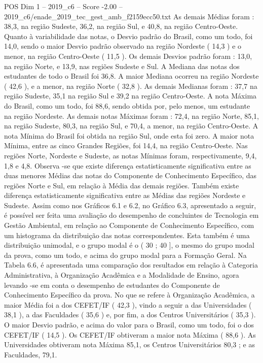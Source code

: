 \begin{textsample}{POS Dim 1 – 2019\_c6 – Score -2.00 – 2019\_c6/enade\_2019\_tec\_gest\_amb\_f2159ecc50.txt}
As demais Médias foram : 38,3, na região Sudeste, 36,2, na região Sul, e 40,8, na região Centro-Oeste.
Quanto à variabilidade das notas, o Desvio padrão do Brasil, como um todo, foi 14,0, sendo o maior Desvio padrão observado na região Nordeste ( 14,3 ) e o menor, na região Centro-Oeste ( 11,5 ).
Os demais Desvios padrão foram : 13,0, na região Norte, e 13,9, nas regiões Sudeste e Sul.
A Mediana das notas dos estudantes de todo o Brasil foi 36,8.
A maior Mediana ocorreu na região Nordeste ( 42,6 ), e a menor, na região Norte ( 32,8 ).
As demais Medianas foram : 37,7 na região Sudeste, 35,1 na região Sul e 39,2 na região Centro-Oeste.
A nota Máxima do Brasil, como um todo, foi 88,6, sendo obtida por, pelo menos, um estudante na região Nordeste.
As demais notas Máximas foram : 72,4, na região Norte, 85,1, na região Sudeste, 80,3, na região Sul, e 70,4, a menor, na região Centro-Oeste.
A nota Mínima do Brasil foi obtida na região Sul, onde esta foi zero.
A maior nota Mínima, entre as cinco Grandes Regiões, foi 14,4, na região Centro-Oeste.
Nas regiões Norte, Nordeste e Sudeste, as notas Mínimas foram, respectivamente, 9,4, 1,8 e 4,8.
Observa -se que existe diferença estatisticamente significativa entre as duas menores Médias das notas do Componente de Conhecimento Específico, das regiões Norte e Sul, em relação à Média das demais regiões.
Também existe diferença estatisticamente significativa entre as Médias das regiões Nordeste e Sudeste.
Assim como nos Gráficos 6.1 e 6.2, no Gráfico 6.3, apresentado a seguir, é possível ser feita uma avaliação do desempenho de concluintes de Tecnologia em Gestão Ambiental, em relação ao Componente de Conhecimento Específico, com um histograma da distribuição das notas correspondentes.
Esta também é uma distribuição unimodal, e o grupo modal é o ( 30 ; 40 ], o mesmo do grupo modal da prova, como um todo, e acima do grupo modal para a Formação Geral.
Na Tabela 6.6, é apresentada uma comparação dos resultados em relação à Categoria Administrativa, à Organização Acadêmica e a Modalidade de Ensino, agora levando -se em conta o desempenho de estudantes do Componente de Conhecimento Específico da prova.
No que se refere à Organização Acadêmica, a maior Média foi a dos CEFET/IF ( 42,3 ), vindo a seguir a das Universidades ( 38,1 ), a das Faculdades ( 35,6 ) e, por fim, a dos Centros Universitários ( 35,3 ).
O maior Desvio padrão, e acima do valor para o Brasil, como um todo, foi o dos CEFET/IF ( 14,5 ).
Os CEFET/IF obtiveram a maior nota Máxima ( 88,6 ).
As Universidades obtiveram nota Máxima 85,1, os Centros Universitários 80,3 ; e as Faculdades, 79,1.

\end{textsample}
